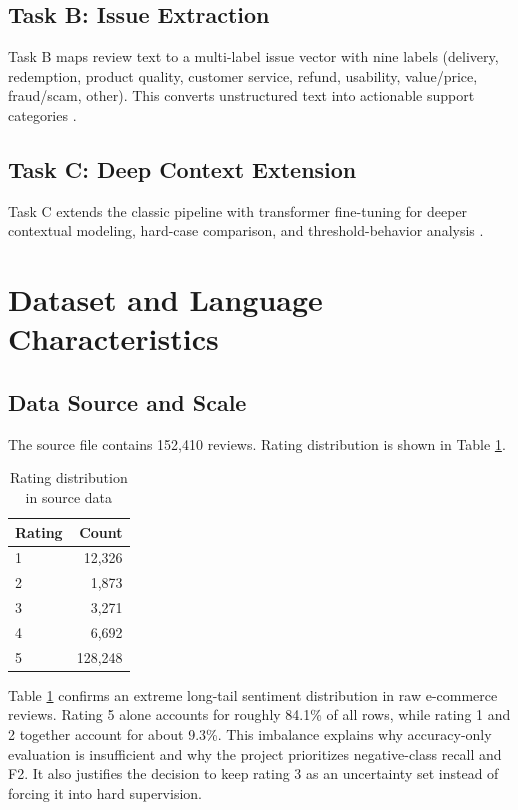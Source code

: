 \documentclass[12pt,a4paper]{article}
\begin{document}
\subsection{Task B: Issue Extraction}
Task B maps review text to a multi-label issue vector with nine labels (delivery, redemption, product quality, customer service, refund, usability, value/price, fraud/scam, other). This converts unstructured text into actionable support categories \cite{tsoumakas2011,zhang2014}.

\subsection{Task C: Deep Context Extension}
Task C extends the classic pipeline with transformer fine-tuning for deeper contextual modeling, hard-case comparison, and threshold-behavior analysis \cite{vaswani2017,devlin2019}.

\section{Dataset and Language Characteristics}
\subsection{Data Source and Scale}
The source file contains 152,410 reviews. Rating distribution is shown in Table \ref{tab:rating_distribution}.

\begin{table}[H]
\centering
\caption{Rating distribution in source data}
\label{tab:rating_distribution}
\begin{tabular}{lr}
\toprule
Rating & Count \\
\midrule
1 & 12,326 \\
2 & 1,873 \\
3 & 3,271 \\
4 & 6,692 \\
5 & 128,248 \\
\bottomrule
\end{tabular}
\end{table}

Table \ref{tab:rating_distribution} confirms an extreme long-tail sentiment distribution in raw e-commerce reviews. Rating 5 alone accounts for roughly 84.1\% of all rows, while rating 1 and 2 together account for about 9.3\%. This imbalance explains why accuracy-only evaluation is insufficient and why the project prioritizes negative-class recall and F2. It also justifies the decision to keep rating 3 as an uncertainty set instead of forcing it into hard supervision.
\end{document}
